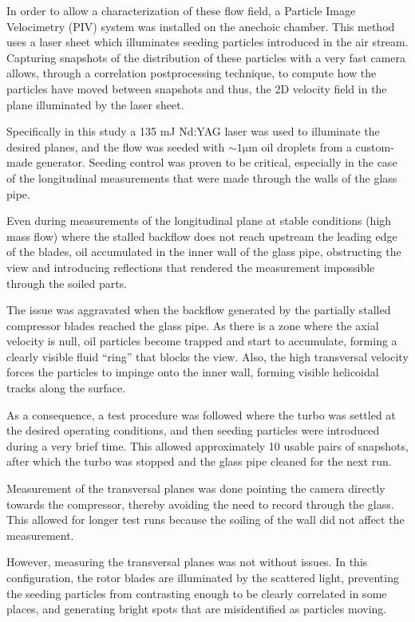 In order to allow a characterization of these flow field, a Particle Image Velocimetry (PIV) system was installed on the anechoic chamber. This method uses a laser sheet which illuminates seeding particles introduced in the air stream. Capturing snapshots of the distribution of these particles with a very fast camera allows, through a correlation postprocessing technique, to compute how the particles have moved between snapshots and thus, the 2D velocity field in the plane illuminated by the laser sheet.

Specifically in this study a 135 mJ Nd:YAG laser was used to illuminate the desired planes, and the flow was seeded with $\sim 1\mathrm{\mu m}$ oil droplets from a custom-made generator. Seeding control was proven to be critical, especially in the case of the longitudinal measurements that were made through the walls of the glass pipe.

Even during measurements of the longitudinal plane at stable conditions (high mass flow) where the stalled backflow does not reach upstream the leading edge of the blades, oil accumulated in the inner wall of the glass pipe, obstructing the view and introducing reflections that rendered the measurement impossible through the soiled parts.

The issue was aggravated when the backflow generated by the partially stalled compressor blades reached the glass pipe. As there is a zone where the axial velocity is null, oil particles become trapped and start to accumulate, forming a clearly visible fluid ``ring'' that blocks the view. Also, the high transversal velocity forces the particles to impinge onto the inner wall, forming visible helicoidal tracks along the surface.

As a consequence, a test procedure was followed where the turbo was settled at the desired operating conditions, and then seeding particles were introduced during a very brief time. This allowed approximately 10 usable pairs of snapshots, after which the turbo was stopped and the glass pipe cleaned for the next run.

Measurement of the transversal planes was done pointing the camera directly towards the compressor, thereby avoiding the need to record through the glass. This allowed for longer test runs because the soiling of the wall did not affect the measurement. 

However, measuring the transversal planes was not without issues. In this configuration, the rotor blades are illuminated by the scattered light, preventing the seeding particles from contrasting enough to be clearly correlated in some places, and generating bright spots that are misidentified as particles moving.

